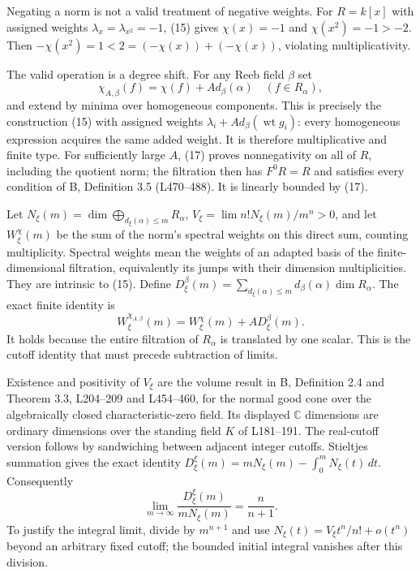 \documentclass[
  11pt,
]{article}
\begin{document}
Negating a norm is not a valid treatment of negative weights. For
\(R=k[x]\) with assigned weights \(\lambda_x=\lambda_{x^2}=-1\), (15)
gives \(\chi(x)=-1\) and \(\chi(x^2)=-1>-2\). Then
\(-\chi(x^2)=1<2=(-\chi(x))+(-\chi(x))\), violating multiplicativity.

The valid operation is a degree shift. For any Reeb field \(\beta\) set
\[
 \chi_{A,\beta}(f)=\chi(f)+A d_\beta(\alpha)
 \quad(f\in R_\alpha),                              \tag{19}
\] and extend by minima over homogeneous components. This is precisely
the construction (15) with assigned weights
\(\lambda_i+A d_\beta(\operatorname{wt}g_i)\): every homogeneous
expression acquires the same added weight. It is therefore
multiplicative and finite type. For sufficiently large \(A\), (17)
proves nonnegativity on all of \(R\), including the quotient norm; the
filtration then has \(F^0R=R\) and satisfies every condition of B,
Definition 3.5 (L470--488). It is linearly bounded by (17).

Let \(N_\xi(m)=\dim\bigoplus_{d_\xi(\alpha)\leq m}R_\alpha\),
\(V_\xi=\lim n!N_\xi(m)/m^n>0\), and let \(W_\xi^\chi(m)\) be the sum of
the norm's spectral weights on this direct sum, counting multiplicity.
Spectral weights mean the weights of an adapted basis of the
finite-dimensional filtration, equivalently its jumps with their
dimension multiplicities. They are intrinsic to (15). Define
\(D_\xi^\beta(m)=\sum_{d_\xi(\alpha)\leq m}
d_\beta(\alpha)\dim R_\alpha\). The exact finite identity is \[
 W_\xi^{\chi_{A,\beta}}(m)=W_\xi^\chi(m)+A D_\xi^\beta(m).
 \tag{20}
\] It holds because the entire filtration of \(R_\alpha\) is translated
by one scalar. This is the cutoff identity that must precede subtraction
of limits.

Existence and positivity of \(V_\xi\) are the volume result in B,
Definition 2.4 and Theorem 3.3, L204--209 and L454--460, for the normal
good cone over the algebraically closed characteristic-zero field. Its
displayed \(\mathbb C\) dimensions are ordinary dimensions over the
standing field \(K\) of L181--191. The real-cutoff version follows by
sandwiching between adjacent integer cutoffs. Stieltjes summation gives
the exact identity \(D_\xi^\xi(m)=mN_\xi(m)-\int_0^mN_\xi(t)\,dt\).
Consequently \[
 \lim_{m\to\infty}\frac{D_\xi^\xi(m)}{mN_\xi(m)}=
 \frac{n}{n+1}.                                    \tag{21}
\] To justify the integral limit, divide by \(m^{n+1}\) and use
\(N_\xi(t)=V_\xi t^n/n!+o(t^n)\) beyond an arbitrary fixed cutoff; the
bounded initial integral vanishes after this division.
\end{document}
